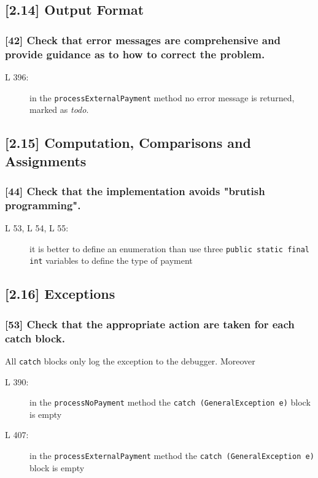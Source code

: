 \subsection*{[2.14] Output Format}
\subsubsection*{[42] Check that error messages are comprehensive and provide guidance as to how to correct the problem.}
\begin{description}
	\item[L 396:] in the {\tt processExternalPayment} method no error message is returned, marked as \emph{todo}.
\end{description}

\subsection*{[2.15] Computation, Comparisons and Assignments}
\subsubsection*{[44] Check that the implementation avoids "brutish programming".}
\begin{description}
	\item[L 53, L 54, L 55:] it is better to define an enumeration than use three {\tt public static final int} variables to define the type of payment
\end{description}

\subsection*{[2.16] Exceptions}
\subsubsection*{[53] Check that the appropriate action are taken for each catch block.}
All {\tt catch} blocks only log the exception to the debugger. Moreover
\begin{description}
	\item[L 390:] in the {\tt processNoPayment} method the {\tt catch (GeneralException e)} block is empty
	\item[L 407:] in the {\tt processExternalPayment} method the \mbox{{\tt catch (GeneralException e)}} block is empty
\end{description}